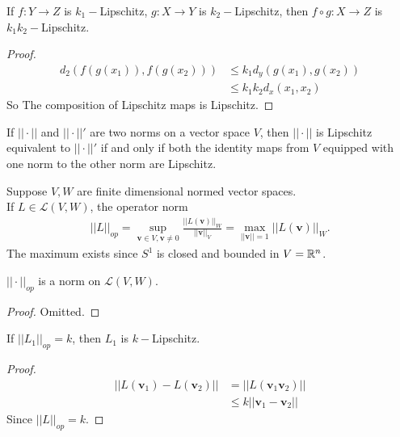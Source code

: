 \documentclass[a4paper]{article}
\begin{document}
\begin{prop}
If $f:Y \to Z$ is $k_1-$Lipschitz, $g:X \to Y$ is $k_2-$Lipschitz, then $f\circ g: X \to Z$ is $k_1k_2-$Lipschitz.
\begin{proof}
\begin{equation*}
\begin{aligned}
d_2\left(f\left(g\left(x_1\right)\right),f\left(g\left(x_2\right)\right)\right) &\leq k_1 d_y\left(g\left(x_1\right),g\left(x_2\right)\right)\\
&\leq k_1k_2d_x\left(x_1,x_2\right)
\end{aligned}
\end{equation*}
So The composition of Lipschitz maps is Lipschitz.
\end{proof}
\end{prop}

\begin{prop}
If $||\cdot||$ and $||\cdot||'$ are two norms on a vector space $V$, then $||\cdot||$ is Lipschitz equivalent to $||\cdot||'$ if and only if both the identity maps from $V$ equipped with one norm to the other norm are Lipschitz.
\end{prop}

\begin{defi}
Suppose $V,W$ are finite dimensional normed vector spaces.\\
If $L \in \mathcal{L}\left(V,W\right)$, the operator norm
\begin{equation*}
\begin{aligned}
||L||_{op} = \sup_{\mathbf{v} \in V,\mathbf{v} \neq 0} \frac{||L\left(\mathbf{v}\right)||_W}{||\mathbf{v}||_V} = \max_{||\mathbf{v}||=1}||L\left(\mathbf{v}\right)||_W.
\end{aligned}
\end{equation*}
The maximum exists since $S^1$ is closed and bounded in $V=\mathbb{R}^n$.
\end{defi}

\begin{lemma}
$||\cdot||_{op}$ is a norm on $\mathcal{L}\left(V,W\right)$.
\begin{proof}
Omitted.
\end{proof}
\end{lemma}

\begin{prop}
If $||L_1||_{op} = k$, then $L_1$ is $k-$Lipschitz.
\begin{proof}
\begin{equation*}
\begin{aligned}
||L\left(\mathbf{v}_1\right)-L\left(\mathbf{v}_2\right)|| &= ||L\left(\mathbf{v}_1\mathbf{v}_2\right)||\\&\leq k||\mathbf{v}_1-\mathbf{v}_2||
\end{aligned}
\end{equation*}
Since $||L||_{op} = k$.
\end{proof}
\end{prop}
\end{document}
